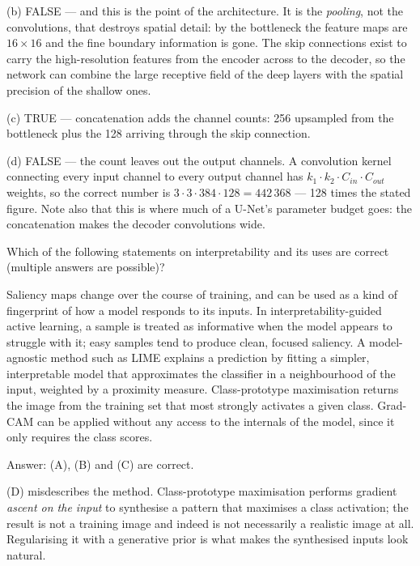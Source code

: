 \documentclass[11pt]{exam}
\begin{document}
\begin{questions}
\begin{solution}
  (b) FALSE --- and this is the point of the architecture. It is the \emph{pooling}, not the
  convolutions, that destroys spatial detail: by the bottleneck the feature maps are $16 \times 16$
  and the fine boundary information is gone. The skip connections exist to carry the
  high-resolution features from the encoder across to the decoder, so the network can combine the
  large receptive field of the deep layers with the spatial precision of the shallow ones.

  (c) TRUE --- concatenation adds the channel counts: 256 upsampled from the bottleneck plus the
  128 arriving through the skip connection.

  (d) FALSE --- the count leaves out the output channels. A convolution kernel connecting every
  input channel to every output channel has $k_1 \cdot k_2 \cdot C_{in} \cdot C_{out}$ weights, so
  the correct number is $3 \cdot 3 \cdot 384 \cdot 128 = 442\,368$ --- 128 times the stated figure.
  Note also that this is where much of a U-Net's parameter budget goes: the concatenation makes the
  decoder convolutions wide.
\end{solution}

\question
Which of the following statements on interpretability and its uses are correct (multiple answers
are possible)?

\begin{choices}
  \choice Saliency maps change over the course of training, and can be used as a kind of
  fingerprint of how a model responds to its inputs.
  \choice In interpretability-guided active learning, a sample is treated as informative when the
  model appears to struggle with it; easy samples tend to produce clean, focused saliency.
  \choice A model-agnostic method such as LIME explains a prediction by fitting a simpler,
  interpretable model that approximates the classifier in a neighbourhood of the input, weighted by
  a proximity measure.
  \choice Class-prototype maximisation returns the image from the training set that most strongly
  activates a given class.
  \choice Grad-CAM can be applied without any access to the internals of the model, since it only
  requires the class scores.
\end{choices}

\begin{solution}
  Answer: (A), (B) and (C) are correct.

  (D) misdescribes the method. Class-prototype maximisation performs gradient \emph{ascent on the
  input} to synthesise a pattern that maximises a class activation; the result is not a training
  image and indeed is not necessarily a realistic image at all. Regularising it with a generative
  prior is what makes the synthesised inputs look natural.


\end{solution}
\end{questions}
\end{document}
